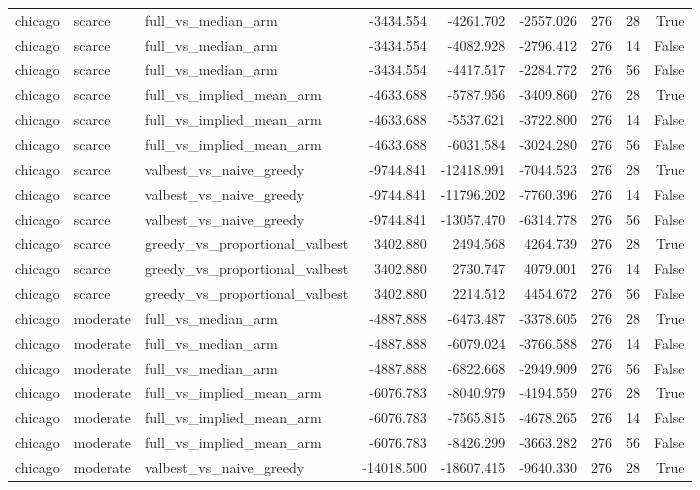 \begin{tabular}{lllrrrrrr}
chicago & scarce & full\_vs\_median\_arm & -3434.554 & -4261.702 & -2557.026 & 276 & 28 & True \\
chicago & scarce & full\_vs\_median\_arm & -3434.554 & -4082.928 & -2796.412 & 276 & 14 & False \\
chicago & scarce & full\_vs\_median\_arm & -3434.554 & -4417.517 & -2284.772 & 276 & 56 & False \\
chicago & scarce & full\_vs\_implied\_mean\_arm & -4633.688 & -5787.956 & -3409.860 & 276 & 28 & True \\
chicago & scarce & full\_vs\_implied\_mean\_arm & -4633.688 & -5537.621 & -3722.800 & 276 & 14 & False \\
chicago & scarce & full\_vs\_implied\_mean\_arm & -4633.688 & -6031.584 & -3024.280 & 276 & 56 & False \\
chicago & scarce & valbest\_vs\_naive\_greedy & -9744.841 & -12418.991 & -7044.523 & 276 & 28 & True \\
chicago & scarce & valbest\_vs\_naive\_greedy & -9744.841 & -11796.202 & -7760.396 & 276 & 14 & False \\
chicago & scarce & valbest\_vs\_naive\_greedy & -9744.841 & -13057.470 & -6314.778 & 276 & 56 & False \\
chicago & scarce & greedy\_vs\_proportional\_valbest & 3402.880 & 2494.568 & 4264.739 & 276 & 28 & True \\
chicago & scarce & greedy\_vs\_proportional\_valbest & 3402.880 & 2730.747 & 4079.001 & 276 & 14 & False \\
chicago & scarce & greedy\_vs\_proportional\_valbest & 3402.880 & 2214.512 & 4454.672 & 276 & 56 & False \\
chicago & moderate & full\_vs\_median\_arm & -4887.888 & -6473.487 & -3378.605 & 276 & 28 & True \\
chicago & moderate & full\_vs\_median\_arm & -4887.888 & -6079.024 & -3766.588 & 276 & 14 & False \\
chicago & moderate & full\_vs\_median\_arm & -4887.888 & -6822.668 & -2949.909 & 276 & 56 & False \\
chicago & moderate & full\_vs\_implied\_mean\_arm & -6076.783 & -8040.979 & -4194.559 & 276 & 28 & True \\
chicago & moderate & full\_vs\_implied\_mean\_arm & -6076.783 & -7565.815 & -4678.265 & 276 & 14 & False \\
chicago & moderate & full\_vs\_implied\_mean\_arm & -6076.783 & -8426.299 & -3663.282 & 276 & 56 & False \\
chicago & moderate & valbest\_vs\_naive\_greedy & -14018.500 & -18607.415 & -9640.330 & 276 & 28 & True \\

\end{tabular}
